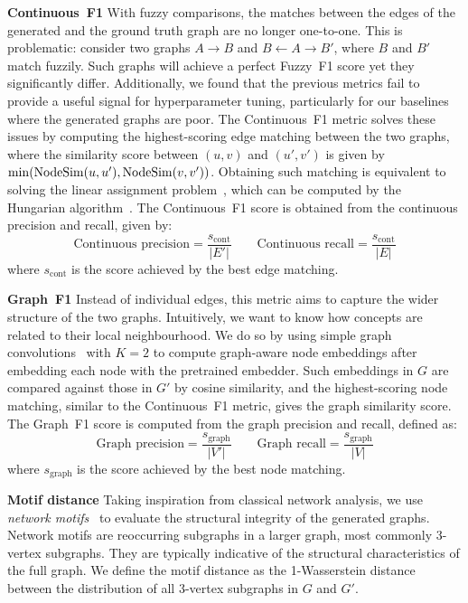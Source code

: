 \textbf{Continuous~F1 }
With fuzzy comparisons, the matches between the edges of the generated and the ground truth graph are no longer one-to-one. This is problematic: consider two graphs $A\!\rightarrow\!B$ and $B\!\leftarrow\!A\!\rightarrow\!B'$, where $B$ and $B'$ match fuzzily. Such graphs will achieve a perfect Fuzzy~F1 score yet they significantly differ. Additionally, we found that the previous metrics fail to provide a useful signal for hyperparameter tuning, particularly for our baselines where the generated graphs are poor. The Continuous~F1 metric solves these issues by computing the highest-scoring edge matching between the two graphs, where the similarity score between $(u, v)$ and $(u', v')$ is given by $\min(\operatorname{NodeSim}(u, u'), \operatorname{NodeSim}(v, v'))$. Obtaining such matching is equivalent to solving the linear assignment problem~\cite{martello1987linear}, which can be computed by the Hungarian algorithm~\cite{kuhn1955hungarian}. The Continuous~F1 score is obtained from the continuous precision and recall, given by:
\[
    \text{Continuous precision} = \frac{s_\text{cont}}{|E'|} \qquad
    \text{Continuous recall} = \frac{s_\text{cont}}{|E|}
\]
where $s_\text{cont}$ is the score achieved by the best edge matching.

\textbf{Graph~F1 }
Instead of individual edges, this metric aims to capture the wider structure of the two graphs. Intuitively, we want to know how concepts are related to their local neighbourhood. We do so by using simple graph convolutions~\cite{wu2019simplifying} with $K=2$ to compute graph-aware node embeddings after embedding each node with the pretrained embedder. Such embeddings in $G$ are compared against those in $G'$ by cosine similarity, and the highest-scoring node matching, similar to the Continuous~F1 metric, gives the graph similarity score. The Graph~F1 score is computed from the graph precision and recall, defined as:
\[
    \text{Graph precision} = \frac{s_\text{graph}}{|V'|} \qquad
    \text{Graph recall} = \frac{s_\text{graph}}{|V|}
\]
where $s_\text{graph}$ is the score achieved by the best node matching.

\textbf{Motif distance }
Taking inspiration from classical network analysis, we use \emph{network motifs}~\cite{milo2002network,shen2002network} to evaluate the structural integrity of the generated graphs. Network motifs are reoccurring subgraphs in a larger graph, most commonly 3-vertex subgraphs. They are typically indicative of the structural characteristics of the full graph. We define the motif distance as the 1-Wasserstein distance~\cite{Kantorovich1960MathematicalMO} between the distribution of all 3-vertex subgraphs in $G$ and $G'$.
